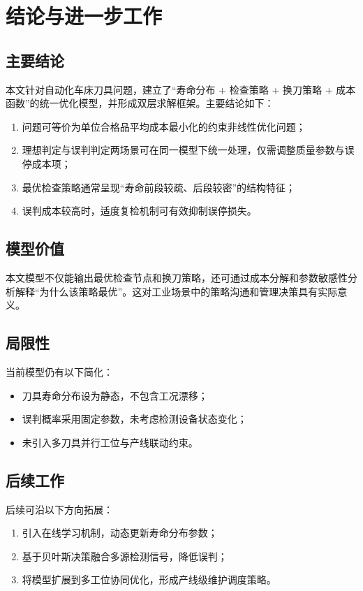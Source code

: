 \chapter{结论与进一步工作}

\section{主要结论}
本文针对自动化车床刀具问题，建立了“寿命分布 + 检查策略 + 换刀策略 + 成本函数”的统一优化模型，并形成双层求解框架。主要结论如下：
\begin{enumerate}
  \item 问题可等价为单位合格品平均成本最小化的约束非线性优化问题；
  \item 理想判定与误判判定两场景可在同一模型下统一处理，仅需调整质量参数与误停成本项；
  \item 最优检查策略通常呈现“寿命前段较疏、后段较密”的结构特征；
  \item 误判成本较高时，适度复检机制可有效抑制误停损失。
\end{enumerate}

\section{模型价值}
本文模型不仅能输出最优检查节点和换刀策略，还可通过成本分解和参数敏感性分析解释“为什么该策略最优”。这对工业场景中的策略沟通和管理决策具有实际意义。

\section{局限性}
当前模型仍有以下简化：
\begin{itemize}
  \item 刀具寿命分布设为静态，不包含工况漂移；
  \item 误判概率采用固定参数，未考虑检测设备状态变化；
  \item 未引入多刀具并行工位与产线联动约束。
\end{itemize}

\section{后续工作}
后续可沿以下方向拓展：
\begin{enumerate}
  \item 引入在线学习机制，动态更新寿命分布参数；
  \item 基于贝叶斯决策融合多源检测信号，降低误判；
  \item 将模型扩展到多工位协同优化，形成产线级维护调度策略。
\end{enumerate}
